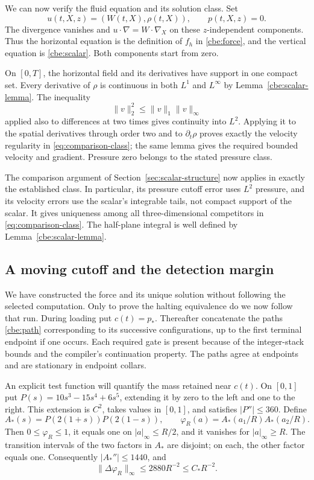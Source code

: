 We can now verify the fluid equation and its solution class.  Set
\begin{equation}\label{cbe:solution}
 u(t,X,z)=(W(t,X),\rho(t,X)),\qquad p(t,X,z)=0.
\end{equation}
The divergence vanishes and $u\cdot\nabla=W\cdot\nabla_X$ on
these $z$-independent components.  Thus the horizontal equation is
the definition of $f_h$ in \eqref{cbe:force}, and the vertical
equation is \eqref{cbe:scalar}.  Both components start from zero.

On $[0,T]$, the horizontal field and its derivatives have support in
one compact set.  Every derivative of $\rho$ is continuous in both
$L^1$ and $L^\infty$ by Lemma~\ref{cbe:scalar-lemma}.
The inequality
\[
 \|v\|_2^2\le\|v\|_1\|v\|_\infty
\]
applied also to differences at two times gives continuity into
$L^2$.  Applying it to the spatial derivatives through order two
and to $\partial_t\rho$ proves exactly the velocity regularity in
\eqref{eq:comparison-class}; the same lemma gives the required bounded velocity
and gradient.  Pressure zero belongs to the stated pressure class.

The comparison argument of Section~\ref{sec:scalar-structure} now
applies in exactly the established class. In particular, its pressure
cutoff error uses $L^2$ pressure, and its velocity errors use the scalar's
integrable tails, not compact support of the scalar. It gives uniqueness
among all three-dimensional competitors in
\eqref{eq:comparison-class}. The half-plane integral is well defined by
Lemma~\ref{cbe:scalar-lemma}.

\subsection{A moving cutoff and the detection margin}
\label{cbe:detection}

We have constructed the force and its unique solution without
following the selected computation.  Only to prove the halting
equivalence do we now follow that run.  During loading put $c(t)=p_*$.
Thereafter concatenate the paths \eqref{cbe:path} corresponding to
its successive configurations, up to the first terminal endpoint
if one occurs.  Each required gate is present because of the
integer-stack bounds and the compiler's continuation property.
The paths agree at endpoints and are stationary in endpoint collars.

An explicit test function will quantify the mass retained near
$c(t)$.  On $[0,1]$ put
$P(s)=10s^3-15s^4+6s^5$, extending it by zero to the left and one
to the right.  This extension is $C^2$, takes values in $[0,1]$,
and satisfies $|P''|\le360$.  Define
\[
 A_*(s)=P(2(1+s))P(2(1-s)),\qquad
 \varphi_R(a)=A_*(a_1/R)A_*(a_2/R).
\]
Then $0\le\varphi_R\le1$, it equals one on
$|a|_\infty\le R/2$, and it vanishes for $|a|_\infty\ge R$.
The transition intervals of the two factors in $A_*$ are disjoint;
on each, the other factor equals one.  Consequently
$|A_*''|\le1440$, and
\begin{equation}\label{cbe:laplacian}
 \|\Delta\varphi_R\|_\infty\le2880R^{-2}\le C_*R^{-2}.
\end{equation}

